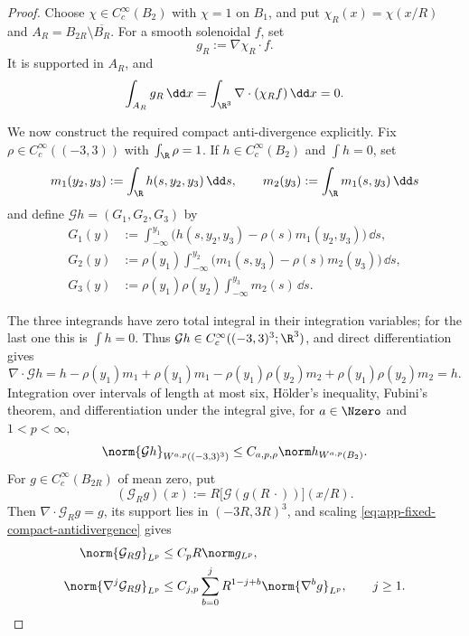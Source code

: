 \begin{proof}
Choose \(\chi\in C_c^\infty(B_2)\) with
\(\chi=1\) on \(B_1\), and put
\(\chi_R(x)=\chi(x/R)\) and
\(A_R=B_{2R}\setminus\overline{B_R}\).  For a smooth solenoidal \(f\), set
\[
 g_R:=\nabla\chi_R\cdot f.
\]
It is supported in \(A_R\), and
\[
 \int_{A_R}g_R\,\dd x
 =\int_{\R^3}\nabla\cdot(\chi_Rf)\,\dd x=0.
\]
\begin{samepage}
We now construct the required compact anti-divergence explicitly.  Fix
\(\rho\in C_c^\infty((-3,3))\) with \(\int_{\R}\rho=1\).  If
\(h\in C_c^\infty(B_2)\) and \(\int h=0\), set
\[
 m_1(y_2,y_3):=\int_{\R} h(s,y_2,y_3)\,\dd s,
 \qquad
 m_2(y_3):=\int_{\R} m_1(s,y_3)\,\dd s
\]
and define \(\mathcal Gh=(G_1,G_2,G_3)\) by
\begin{align*}
 G_1(y)
 &:=\int_{-\infty}^{y_1}
 \bigl(h(s,y_2,y_3)-\rho(s)m_1(y_2,y_3)\bigr)\,\dd s,\\
 G_2(y)
 &:=\rho(y_1)\int_{-\infty}^{y_2}
 \bigl(m_1(s,y_3)-\rho(s)m_2(y_3)\bigr)\,\dd s,\\
 G_3(y)
 &:=\rho(y_1)\rho(y_2)
 \int_{-\infty}^{y_3}m_2(s)\,\dd s.
\end{align*}
\par
\end{samepage}
The three integrands have zero total integral in their integration
variables; for the last one this is \(\int h=0\).  Thus
\(\mathcal Gh\in C_c^\infty((-3,3)^3;\R^3)\), and direct differentiation
gives
\[
 \nabla\cdot\mathcal Gh
 =h-\rho(y_1)m_1
  +\rho(y_1)m_1-\rho(y_1)\rho(y_2)m_2
  +\rho(y_1)\rho(y_2)m_2
 =h.
\]
Integration over intervals of length at most six, H\"older's inequality,
Fubini's theorem, and differentiation under the integral give, for
\(a\in\Nzero\) and \(1<p<\infty\),
\begin{equation}
 \norm{\mathcal Gh}_{W^{a,p}((-3,3)^3)}
 \le C_{a,p,\rho}\norm h_{W^{a,p}(B_2)}.
 \label{eq:app-fixed-compact-antidivergence}
\end{equation}
For \(g\in C_c^\infty(B_{2R})\) of mean zero, put
\[
 (\mathcal G_Rg)(x)
 :=R\bigl[\mathcal G(g(R\,\cdot))\bigr](x/R).
\]
Then \(\nabla\cdot\mathcal G_Rg=g\), its support lies in
\((-3R,3R)^3\), and scaling \eqref{eq:app-fixed-compact-antidivergence}
gives
\begin{align}
 \norm{\mathcal G_Rg}_{L^p}
 &\le C_pR\norm g_{L^p},\notag\\
 \norm{\nabla^j\mathcal G_Rg}_{L^p}
 &\le C_{j,p}\sum_{b=0}^{j}
 R^{1-j+b}\norm{\nabla^bg}_{L^p},
 \qquad j\ge1.
 \label{eq:app-scaled-compact-antidivergence}
\end{align}

\end{proof}

